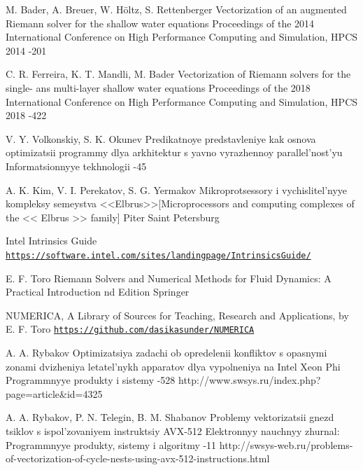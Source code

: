 \documentclass[utf8,english]{psta}%
\begin{document}
\begin{thebibliography}{30}
\by M. Bader, A. Breuer, W. H{\"o}ltz, S. Rettenberger
\paper Vectorization of an augmented Riemann solver for the shallow water equations
\jour Proceedings of the 2014 International Conference on High Performance Computing and Simulation, HPCS 2014
-201

\by C. R. Ferreira, K. T. Mandli, M. Bader
\paper Vectorization of Riemann solvers for the single- ans multi-layer shallow water equations
\jour Proceedings of the 2018 International Conference on High Performance Computing and Simulation, HPCS 2018
-422

\by V. Y. Volkonskiy, S. K. Okunev
\paper Predikatnoye predstavleniye kak osnova optimizatsii programmy dlya arkhitektur s yavno vyrazhennoy parallel'nost'yu
\jour Informatsionnyye tekhnologii
-45

\by A. K. Kim, V. I. Perekatov, S. G. Yermakov
\book Mikroprotsessory i vychislitel'nyye kompleksy semeystva <<Elbrus>>[Microprocessors and computing complexes of the << Elbrus >> family]
\publ Piter
\publaddr Saint Petersburg

\finalinfo Intel Intrinsics Guide\\
\href{https://software.intel.com/sites/landingpage/IntrinsicsGuide/}{{\tt https://software.intel.com/sites/landingpage/IntrinsicsGuide/}}

\by E. F. Toro
\book Riemann Solvers and Numerical Methods for Fluid Dynamics: A Practical Introduction
 nd Edition
\publ Springer

\finalinfo NUMERICA, A Library of Sources for Teaching, Research and Applications, by E. F. Toro
\href{https://github.com/dasikasunder/NUMERICA}{{\tt https://github.com/dasikasunder/NUMERICA}}

\by A. A. Rybakov
\paper Optimizatsiya zadachi ob opredelenii konfliktov s opasnymi zonami dvizheniya letatel'nykh apparatov dlya vypolneniya na Intel Xeon Phi
\jour Programmnyye produkty i sistemy
-528
\URL http://www.swsys.ru/index.php?page=article&id=4325

\by A. A. Rybakov, P. N. Telegin, B. M. Shabanov
\paper Problemy vektorizatsii gnezd tsiklov s ispol'zovaniyem instruktsiy AVX-512
\jour Elektronnyy nauchnyy zhurnal: Programmnyye produkty, sistemy i algoritmy
-11
\URL http://swsys-web.ru/problems-of-vectorization-of-cycle-nests-using-avx-512-instructions.html


\end{thebibliography}
\end{document}
